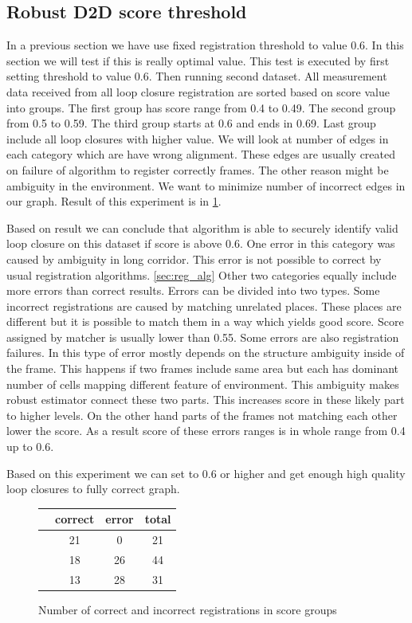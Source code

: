 \subsection {Robust D2D score threshold}
In a previous section we have use fixed registration threshold to value 0.6. In this section we will test if this is really optimal value. This test is executed by first setting threshold to value 0.6. Then running second dataset. All measurement data received from all loop closure registration are sorted based on score value into groups. The first group  has score range from 0.4 to 0.49. The second group from 0.5 to 0.59. The third group starts at 0.6 and ends in 0.69. Last group include all loop closures with higher value. We will look at number of edges in each category which are have wrong alignment. These edges are usually created on failure of algorithm to register correctly frames. The other reason might be ambiguity in the environment. We want to minimize number of incorrect edges in our graph. Result of this experiment is in \ref{fig:robust_matcher_res}.

Based on result we can conclude that algorithm is able to securely identify valid loop closure on this dataset if score is above 0.6. One error in this category was caused by ambiguity in long corridor. This error is not possible to correct by usual registration algorithms. \ref{sec:reg_alg} Other two categories equally include more errors than correct results. Errors can be divided into two types. Some incorrect registrations are caused by matching unrelated places. These places are different but it is possible to match them in a way which yields good score. Score assigned by matcher is usually lower than 0.55. Some errors are also registration failures. In this type of error mostly depends on the structure ambiguity inside of the frame. This happens if two frames include same area but each has dominant number of cells mapping different feature of environment. This ambiguity makes robust estimator connect these two parts. This increases score in these likely part to higher levels. On the other hand parts of the frames not matching each other lower the score. As a result score of these errors ranges is in whole range from 0.4 up to 0.6.

Based on this experiment we can set to 0.6 or higher and get enough high quality loop closures to fully correct graph.    


\begin{figure}
 \centering
  \begin{tabular}{ | c | c | c | c | }
    \hline
    &correct&error&total\\ \hline
    [0.7,1] & 21 & 0& 21\\ \hline
    [0.6, 0.7) & 33 & 1& 34\\ \hline
    [0.5, 0.6)] & 18 & 26& 44\\ \hline
    [0.4, 0.5)]& 13 & 28& 31\\
    \hline
  \end{tabular}
	\caption{Number of correct and incorrect registrations in score groups}  \label{fig:robust_matcher_res}
\end{figure} 

